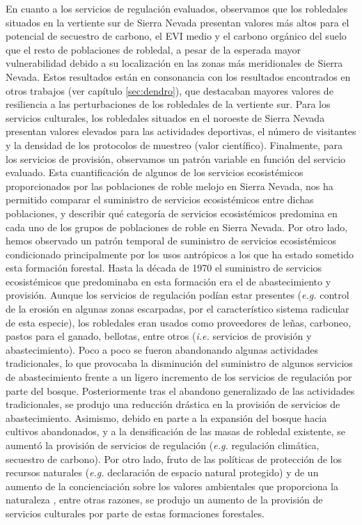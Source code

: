 En cuanto a los servicios de regulación evaluados, observamos que los robledales situados en la vertiente sur de Sierra Nevada presentan valores más altos para el potencial de secuestro de carbono, el EVI medio y el carbono orgánico del suelo que el resto de poblaciones de robledal, a pesar de la esperada mayor vulnerabilidad debido a su localización en las zonas más meridionales de Sierra Nevada. Estos resultados están en consonancia con los resultados encontrados en otros trabajos (ver capítulo \ref{sec:dendro}), que destacaban mayores valores de resiliencia a las perturbaciones de los robledales de la vertiente sur. Para los servicios culturales, los robledales situados en el noroeste de Sierra Nevada presentan valores elevados para las actividades deportivas, el número de visitantes y la densidad de los protocolos de muestreo (valor científico). Finalmente, para los servicios de provisión, observamos un patrón variable en función del servicio evaluado. Esta cuantificación de algunos de los servicios ecosistémicos proporcionados por las poblaciones de roble melojo en Sierra Nevada, nos ha permitido comparar el suministro de servicios ecosistémicos entre dichas poblaciones, y describir qué categoría de servicios ecosistémicos predomina en cada uno de los grupos de poblaciones de roble en Sierra Nevada. Por otro lado, hemos observado un patrón temporal de suministro de servicios ecosistémicos condicionado principalmente por los usos antrópicos a los que ha estado sometido esta formación forestal. Hasta la década de 1970 el suministro de servicios ecosistémicos que predominaba en esta formación era el de abastecimiento y provisión. Aunque los servicios de regulación podían estar presentes (\emph{e.g.} control de la erosión en algunas zonas escarpadas, por el característico sistema radicular de esta especie), los robledales eran usados como proveedores de leñas, carboneo, pastos para el ganado, bellotas, entre otros (\emph{i.e.} servicios de provisión y abastecimiento). Poco a poco se fueron abandonando algunas actividades tradicionales, lo que provocaba la disminución del suministro de algunos servicios de abastecimiento frente a un ligero incremento de los servicios de regulación por parte del bosque. Posteriormente tras el abandono generalizado de las actividades tradicionales, se produjo una reducción drástica en la provisión de servicios de abastecimiento. Asimismo, debido en parte a la expansión del bosque hacia cultivos abandonados, y a la densificación de las masas de robledal existente, se aumentó la provisión de servicios de regulación (\emph{e.g.} regulación climática, secuestro de carbono). Por otro lado, fruto de las políticas de protección de los recursos naturales (\emph{e.g.} declaración de espacio natural protegido) y de un aumento de la concienciación sobre los valores ambientales que proporciona la naturaleza \autocite{Mace2014WhoseConservation}, entre otras razones, se produjo un aumento de la provisión de servicios culturales por parte de estas formaciones forestales. 

